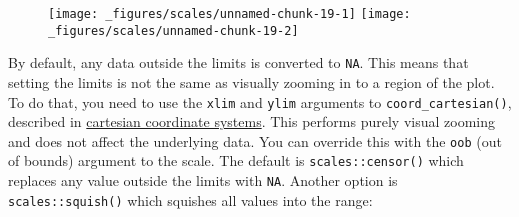 \begin{Shaded}
\begin{Highlighting}[]
\OperatorTok{+}\StringTok{ }
\StringTok{  }\NormalTok{(}\NormalTok{(}\OperatorTok{+}\StringTok{ }
\StringTok{  }\NormalTok{(} \NormalTok{)}
\OperatorTok{+}\StringTok{ }
\StringTok{  }\NormalTok{(}\NormalTok{(}\OperatorTok{+}\StringTok{ }
\StringTok{  }\NormalTok{(} \NormalTok{(}\NormalTok{,}\NormalTok{)) }\OperatorTok{+}\StringTok{ }
\StringTok{  }\NormalTok{(} \NormalTok{(}\NormalTok{,}\NormalTok{)) }\OperatorTok{+}
\StringTok{  }\NormalTok{(} \NormalTok{)}
\end{Highlighting}
\end{Shaded}

\begin{figure}[H]
  \centering
  \texttt{[image: \_figures/scales/unnamed-chunk-19-1]}%
  \texttt{[image: \_figures/scales/unnamed-chunk-19-2]}
\end{figure}

By default, any data outside the limits is converted to \texttt{NA}.
This means that setting the limits is not the same as visually zooming
in to a region of the plot. To do that, you need to use the
\texttt{xlim} and \texttt{ylim} arguments to
\texttt{coord\_cartesian()}, described in
\protect\hyperlink{sub:cartesian}{cartesian coordinate systems}. This
performs purely visual zooming and does not affect the underlying data.
 You can override this with the \texttt{oob} (out of
bounds) argument to the scale. The default is \texttt{scales::censor()}
which replaces any value outside the limits with \texttt{NA}. Another
option is \texttt{scales::squish()} which squishes all values into the
range:

